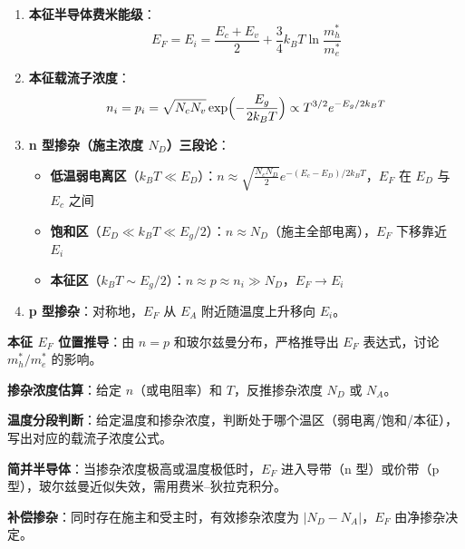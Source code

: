 \begin{formulabox}[核心公式]
\begin{enumerate}[label=\textbf{(\arabic*)}]
    \item \textbf{本征半导体费米能级}：
    \[
    E_F=E_i=\frac{E_c+E_v}{2}+\frac{3}{4}k_BT\ln\frac{m_h^*}{m_e^*}
    \]

    \item \textbf{本征载流子浓度}：
    \[
    n_i=p_i=\sqrt{N_cN_v}\exp\Bigl(-\frac{E_g}{2k_BT}\Bigr)
    \propto T^{3/2}e^{-E_g/2k_BT}
    \]

    \item \textbf{n 型掺杂（施主浓度 $N_D$）三段论}：
    \begin{itemize}[nosep]
        \item \textbf{低温弱电离区}（$k_BT\ll E_D$）：$n\approx\sqrt{\frac{N_cN_D}{2}}e^{-(E_c-E_D)/2k_BT}$，$E_F$ 在 $E_D$ 与 $E_c$ 之间
        \item \textbf{饱和区}（$E_D\ll k_BT\ll E_g/2$）：$n\approx N_D$（施主全部电离），$E_F$ 下移靠近 $E_i$
        \item \textbf{本征区}（$k_BT\sim E_g/2$）：$n\approx p\approx n_i\gg N_D$，$E_F\to E_i$
    \end{itemize}

    \item \textbf{p 型掺杂}：对称地，$E_F$ 从 $E_A$ 附近随温度上升移向 $E_i$。
\end{enumerate}
\end{formulabox}

\begin{drillbox}[训练点与考法变体]
 \textbf{本征 $E_F$ 位置推导}：由 $n=p$ 和玻尔兹曼分布，严格推导出 $E_F$ 表达式，讨论 $m_h^*/m_e^*$ 的影响。

 \textbf{掺杂浓度估算}：给定 $n$（或电阻率）和 $T$，反推掺杂浓度 $N_D$ 或 $N_A$。

 \textbf{温度分段判断}：给定温度和掺杂浓度，判断处于哪个温区（弱电离/饱和/本征），写出对应的载流子浓度公式。

 \textbf{简并半导体}：当掺杂浓度极高或温度极低时，$E_F$ 进入导带（n 型）或价带（p 型），玻尔兹曼近似失效，需用费米--狄拉克积分。

 \textbf{补偿掺杂}：同时存在施主和受主时，有效掺杂浓度为 $|N_D-N_A|$，$E_F$ 由净掺杂决定。
\end{drillbox}

